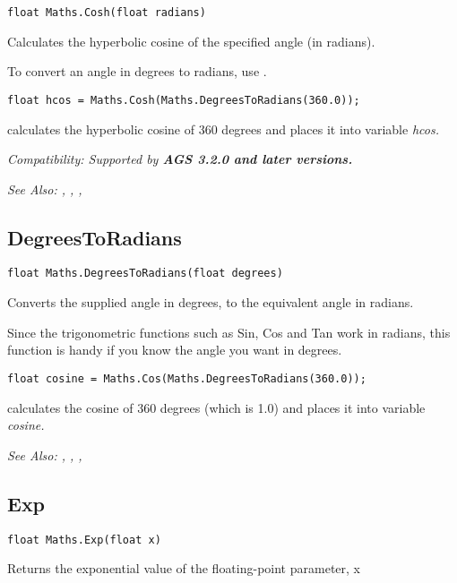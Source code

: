 \begin{verbatim}
float Maths.Cosh(float radians)
\end{verbatim}
Calculates the hyperbolic cosine of the specified angle (in radians).

To convert an angle in degrees to radians, use .

\begin{verbatim}
float hcos = Maths.Cosh(Maths.DegreesToRadians(360.0));
\end{verbatim}
calculates the hyperbolic cosine of 360 degrees and places it into variable \it{hcos}.

\it{Compatibility:} Supported by \bf{AGS 3.2.0} and later versions.

\it{See Also:} ,
,
, 


\subsection{DegreesToRadians}\label{Maths.DegreesToRadians}%

\begin{verbatim}
float Maths.DegreesToRadians(float degrees)
\end{verbatim}
Converts the supplied angle in degrees, to the equivalent angle in radians.

Since the trigonometric functions such as Sin, Cos and Tan work in radians, this
function is handy if you know the angle you want in degrees.

\begin{verbatim}
float cosine = Maths.Cos(Maths.DegreesToRadians(360.0));
\end{verbatim}
calculates the cosine of 360 degrees (which is 1.0) and places it into variable \it{cosine}.

\it{See Also:} ,
,
, 


\subsection{Exp}\label{Maths.Exp}%

\begin{verbatim}
float Maths.Exp(float x)
\end{verbatim}
Returns the exponential value of the floating-point parameter, x

